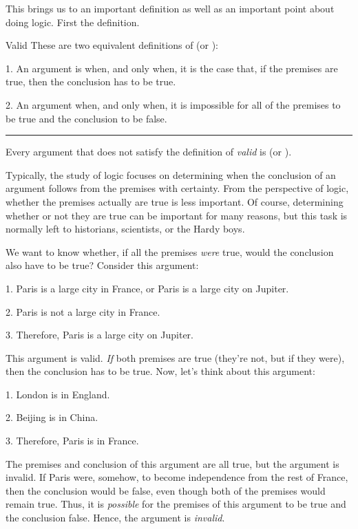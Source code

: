 This brings us to an important definition as well as an important point about doing logic. First the definition. 
\begin{factboxy}{Valid}
These are two equivalent definitions of  (or ):
\begin{ebullet}
\vspace{-2mm}
\item[1.] An argument is  when, and only when, it is the case that, if the premises are true, then the conclusion has to be true.

\item[2.] An argument  when, and only when, it is impossible for all of the premises to be true and the conclusion to be false.
\end{ebullet}

\hrule
\medskip

Every argument that does not satisfy the definition of \textit{valid} is  (or ).
\end{factboxy}
\noindent Typically, the study of logic focuses on determining when the conclusion of an argument follows from the premises with certainty. From the perspective of logic, whether the premises actually are true is less important. Of course, determining whether or not they are true can be important for many reasons, but this task is normally left to historians, scientists, or the Hardy boys.

We want to know whether, if all the premises \textit{were} true, would the conclusion also have to be true? Consider this argument:
	\begin{earg}
		\item[1.] Paris is a large city in France, or Paris is a large city on Jupiter.
		\item[2.] Paris is not a large city in France.
		\item[3.] Therefore, Paris is a large city on Jupiter.
	\end{earg}
This argument is valid. \emph{If} both premises are true (they're not, but if they were), then the conclusion has to be true. Now, let's think about this argument:
	\begin{earg}
		\item[1.] London is in England.
		\item[2.] Beijing is in China.
		\item[3.] Therefore, Paris is in France.
	\end{earg}
The premises and conclusion of this argument are all true, but the argument is invalid. If Paris were, somehow, to become independence from the rest of France, then the conclusion would be false, even though both of the premises would remain true. Thus, it is \emph{possible} for the premises of this argument to be true and the conclusion false. Hence, the argument is \textit{invalid}.

